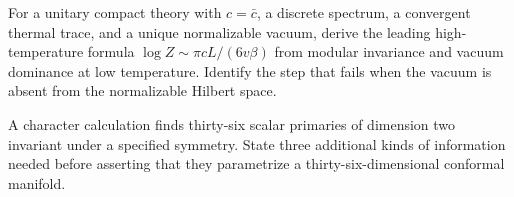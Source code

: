 \begin{exercise}\label{ex:cft-thermal}
For a unitary compact theory with $c=\bar c$, a discrete spectrum,
a convergent thermal trace, and a unique normalizable vacuum,
derive the leading high-temperature
formula $\log Z\sim\pi cL/(6v\beta)$ from modular invariance and
vacuum dominance at low temperature. Identify the step that fails when the
vacuum is absent from the normalizable Hilbert space.

\par\smallskip{}\par
\end{exercise}

\begin{exercise}\label{ex:cft-marginality}
A character calculation finds thirty-six scalar primaries of
dimension two invariant under a specified symmetry. State three
additional kinds of information needed before asserting that they
parametrize a thirty-six-dimensional conformal manifold.

\par\smallskip{}\par
\end{exercise}
